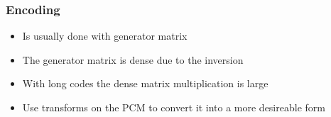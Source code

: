 \documentclass[	%
				]{beamer}
\begin{document}

\begin{frame}[fragile]
	\frametitle{Encoding}
	\begin{itemize}
		\item Is usually done with generator matrix
		\item The generator matrix is dense due to the inversion
		\item With long codes the dense matrix multiplication is large
		\item Use transforms on the PCM to convert it into a more desireable form\cite{QiGo07}
	\end{itemize}
	
\end{frame}
\end{document}
